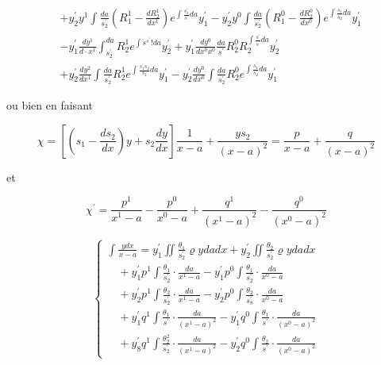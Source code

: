\documentclass{article}
\begin{document}
\[\begin{aligned}
& +y_{2}^{\prime} y^{1} \int \frac{d a}{s_{2}^{\prime}}\left(R_{1}^{1}-\frac{d R_{2}^{1}}{d x^{1}}\right) e^{\int \frac{s_{1}^{\prime}}{s^{\prime}} d a} y_{1}^{\prime}-y_{2}^{\prime} y^{0} \int \frac{d a}{s_{2}^{\prime}}\left(R_{1}^{0}-\frac{d R_{2}^{0}}{d x^{0}}\right) e^{\int \frac{s_{1}^{\prime}}{s_{2}^{\prime}} d a} y_{1}^{\prime} \\
& -y_{1}^{\prime} \frac{d y^{1}}{d \cdot x^{1}} \int_{s_{2}^{\prime}}^{d a} R_{2}^{1} e^{\int s^{s^{\prime}} ! d a} y_{2}^{\prime}+y_{1}^{\prime} \frac{d y^{0}}{d x^{0} x^{0}} \frac{d a}{s^{\prime}} R_{2}^{0} R_{2}^{\int \frac{s^{\prime}}{s^{\prime}} d a} y_{2}^{\prime} \\
& +y_{2}^{\prime} \frac{d y^{2}}{d x^{1}} \int \frac{d a}{s_{2}^{\prime}} R_{2}^{1} e^{\int \frac{s_{1}^{\prime} s_{2}}{s_{2}} d a} y_{1}^{\prime}-y_{2}^{\prime} \frac{d y^{0}}{d x^{0}} \int \frac{d a}{s_{2}^{\prime}} R_{2}^{0} e^{\int \frac{s_{1}^{\prime}}{s_{2}^{\prime}} d a} y_{1}^{\prime}
\end{aligned}
\]

ou bien en faisant

\[
\chi=\left[\left(s_{1}-\frac{d s_{2}}{d x}\right) y+s_{2} \frac{d y}{d x}\right] \frac{1}{x-a}+\frac{y s_{2}}{(x-a)^{2}}=\frac{p}{x-a}+\frac{q}{(x-a)^{2}}
\]

et

\[
\chi^{\prime}=\frac{p^{1}}{x^{1}-a}-\frac{p^{0}}{x^{0}-a}+\frac{q^{1}}{\left(x^{1}-a\right)^{2}}-\frac{q^{0}}{\left(x^{0}-a\right)^{2}}
\]

\[
\left\{\begin{array}{c}
\int \frac{y d x}{x-a}=y_{1}^{\prime} \iint \frac{\theta_{1}}{s_{2}^{\prime}} \varrho y d a d x+y_{2}^{\prime} \iint \frac{\theta_{2}}{s_{2}^{\prime}} \varrho y d a d x \\
\quad+y_{1}^{\prime} p^{1} \int \frac{\theta_{1}}{s_{2}^{\prime}} \cdot \frac{d a}{x^{1}-a}-y_{1}^{\prime} p^{0} \int \frac{\theta_{1}}{s_{2}^{\prime}} \cdot \frac{d a}{x^{0}-a} \\
\quad+y_{2}^{\prime} p^{1} \int \frac{\theta_{2}}{s_{2}^{\prime}} \cdot \frac{d a}{x^{1}-a}-y_{2}^{\prime} p^{0} \int \frac{\theta_{2}}{s_{8}^{\prime}} \cdot \frac{d a}{x^{0}-a} \\
\quad+y_{1}^{\prime} q^{1} \int \frac{\theta_{1}}{s^{\prime}} \cdot \frac{d a}{\left(x^{1}-a\right)^{2}}-y_{1}^{\prime} q^{0} \int \frac{\theta_{1}}{s^{\prime}} \cdot \frac{d a}{\left(x^{0}-a\right)^{2}} \\
\quad+y_{8}^{\prime} q^{1} \int \frac{\theta_{2}^{2}}{s_{2}^{\prime}} \cdot \frac{d a}{\left(x^{1}-a\right)^{2}}-y_{2}^{\prime} q^{0} \int \frac{\theta_{2}}{s^{\prime}} \cdot \frac{d a}{\left(x^{0}-a\right)^{2}}
\end{array}\right.
\]
\end{document}
